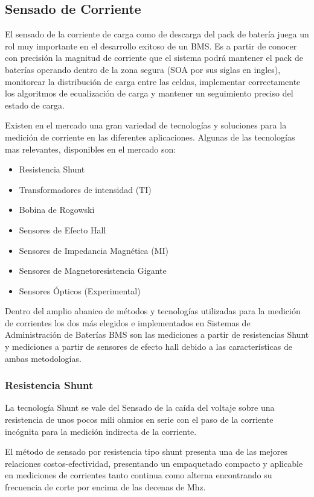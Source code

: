 \documentclass[10pt,a4paper]{article}
\begin{document}
\subsection{Sensado de Corriente}

El sensado de la corriente de carga como de descarga del pack de batería juega
un rol muy importante en el desarrollo exitoso de un \acrshort{BMS}. Es a partir
de conocer con precisión la magnitud de corriente que el sistema podrá mantener
el pack de baterías operando dentro de la zona segura (\acrshort{SOA} por sus
siglas en ingles), monitorear la distribución de carga entre las celdas,
implementar correctamente los algoritmos de ecualización de carga y mantener un
seguimiento preciso del estado de carga.

\noindent Existen en el mercado una gran variedad de tecnologías y 
soluciones para la medición de corriente en las diferentes aplicaciones. 
Algunas de las tecnologías mas relevantes, disponibles en el mercado son:
\begin{itemize}
    \item Resistencia Shunt
    \item Transformadores de intensidad (TI)
    \item Bobina de Rogowski 
    \item Sensores de Efecto Hall
    \item Sensores de Impedancia Magnética (MI)
    \item Sensores de Magnetoresistencia Gigante 
    \item Sensores Ópticos (Experimental)
\end{itemize}

Dentro del amplio abanico de métodos y tecnologías utilizadas para la medición
de corrientes los dos más elegidos e implementados en Sistemas de Administración
de Baterías \acrshort{BMS} son las mediciones a partir de resistencias Shunt y
mediciones a partir de sensores de efecto hall debido a las caracter\'isticas de
ambas metodolog\'ias.

\subsubsection{Resistencia Shunt}

La tecnología Shunt se vale del Sensado de la caída del voltaje sobre una
resistencia de unos pocos mili ohmios en serie con el paso de la corriente
incógnita para la medición indirecta de la corriente.

El método de sensado por resistencia tipo shunt presenta una de las mejores
relaciones costos-efectividad, presentando un empaquetado compacto y aplicable
en mediciones de corrientes tanto continua como alterna encontrando su
frecuencia de corte por encima de las decenas de Mhz.
\end{document}
